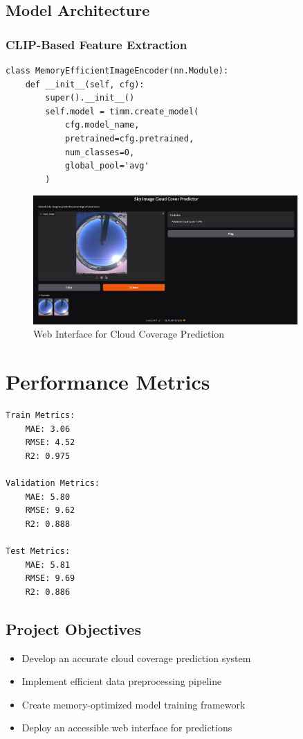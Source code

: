 \documentclass[11pt,a4paper]{article}
\begin{document}
\subsection{Model Architecture}

\subsubsection{CLIP-Based Feature Extraction}
\begin{lstlisting}
class MemoryEfficientImageEncoder(nn.Module):
    def __init__(self, cfg):
        super().__init__()
        self.model = timm.create_model(
            cfg.model_name,
            pretrained=cfg.pretrained,
            num_classes=0,
            global_pool='avg'
        )
\end{lstlisting}

\begin{figure}[H]
\centering
\includegraphics[width=0.9\textwidth]{website.png}
\caption{Web Interface for Cloud Coverage Prediction}
\label{fig:interface}
\end{figure}

\section{Performance Metrics}
\begin{resultbox}
\begin{verbatim}
Train Metrics:
    MAE: 3.06
    RMSE: 4.52
    R2: 0.975

Validation Metrics:
    MAE: 5.80
    RMSE: 9.62
    R2: 0.888

Test Metrics:
    MAE: 5.81
    RMSE: 9.69
    R2: 0.886
\end{verbatim}
\end{resultbox}



\subsection{Project Objectives}
\begin{itemize}
    \item Develop an accurate cloud coverage prediction system
    \item Implement efficient data preprocessing pipeline
    \item Create memory-optimized model training framework
    \item Deploy an accessible web interface for predictions
\end{itemize}
\end{document}
